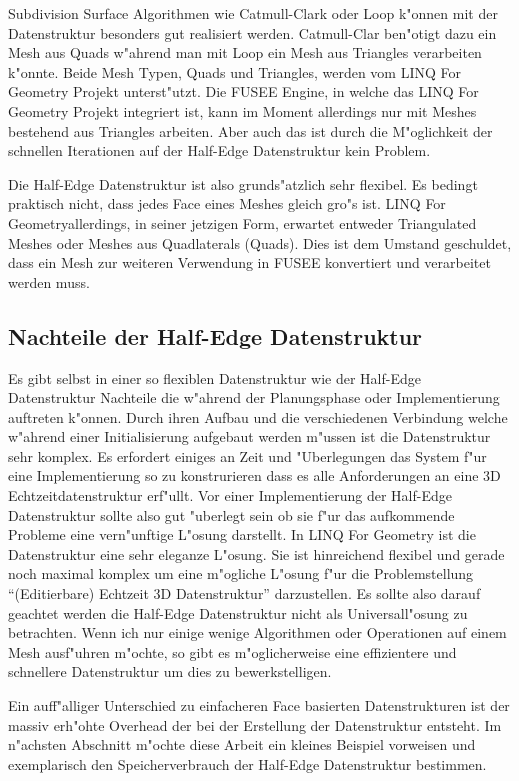 \documentclass[pagesize, paper=a4, fontsize=12pt,titlepage=true, headings=small, headnosepline, abstractoff, liststotoc, nochapterprefix, plainheadsepline]{scrreprt}
\newcommand{\LFG}{LINQ For Geometry}
\newcommand{\LFGS}{LINQ For Geometry }
\newcommand{\HES}{Half-Edge Datenstruktur }
\begin{document}
Subdivision Surface Algorithmen wie Catmull-Clark oder Loop k"onnen mit der Datenstruktur besonders gut realisiert werden. Catmull-Clar ben"otigt dazu ein Mesh aus Quads w"ahrend man mit Loop ein Mesh aus Triangles verarbeiten k"onnte. Beide Mesh Typen, Quads und Triangles, werden vom \LFGS Projekt unterst"utzt. Die FUSEE Engine, in welche das \LFGS Projekt integriert ist, kann im Moment allerdings nur mit Meshes bestehend aus Triangles arbeiten. Aber auch das ist durch die M"oglichkeit der schnellen Iterationen auf der \HES kein Problem.

Die \HES ist also grunds"atzlich sehr flexibel. Es bedingt praktisch nicht, dass jedes Face eines Meshes gleich gro"s ist. \LFG allerdings, in seiner jetzigen Form, erwartet entweder Triangulated Meshes oder Meshes aus Quadlaterals (Quads). Dies ist dem Umstand geschuldet, dass ein Mesh zur weiteren Verwendung in FUSEE konvertiert und verarbeitet werden muss.
		\subsection {Nachteile der \HES}
Es gibt selbst in einer so flexiblen Datenstruktur wie der \HES Nachteile die w"ahrend der Planungsphase oder Implementierung auftreten k"onnen.
			Durch ihren Aufbau und die verschiedenen Verbindung welche w"ahrend einer Initialisierung aufgebaut werden m"ussen ist die Datenstruktur sehr komplex. Es erfordert einiges an Zeit und "Uberlegungen das System f"ur eine Implementierung so zu konstrurieren dass es alle Anforderungen an eine 3D Echtzeitdatenstruktur erf"ullt. Vor einer Implementierung der \HES sollte also gut "uberlegt sein ob sie f"ur das aufkommende Probleme eine vern"unftige L"osung darstellt. In \LFGS ist die Datenstruktur eine sehr eleganze L"osung. Sie ist hinreichend flexibel und gerade noch maximal komplex um eine m"ogliche L"osung f"ur die Problemstellung "`(Editierbare) Echtzeit 3D Datenstruktur"' darzustellen. Es sollte also darauf geachtet werden die \HES nicht als Universall"osung zu betrachten. Wenn ich nur einige wenige Algorithmen oder Operationen auf einem Mesh ausf"uhren m"ochte, so gibt es m"oglicherweise eine effizientere und schnellere Datenstruktur um dies zu bewerkstelligen.

Ein auff"alliger Unterschied zu einfacheren Face basierten Datenstrukturen ist der massiv erh"ohte Overhead der bei der Erstellung der Datenstruktur entsteht. Im n"achsten Abschnitt m"ochte diese Arbeit ein kleines Beispiel vorweisen und exemplarisch den Speicherverbrauch der \HES bestimmen.
\end{document}
